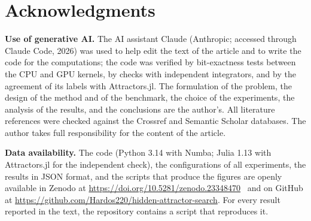 \section*{Acknowledgments}
\textbf{Use of generative AI.} The AI assistant Claude (Anthropic; accessed through Claude Code, 2026) was used to help edit the text of the article and to write the code for the computations; the code was verified by bit-exactness tests between the CPU and GPU kernels, by checks with independent integrators, and by the agreement of its labels with Attractors.jl. The formulation of the problem, the design of the method and of the benchmark, the choice of the experiments, the analysis of the results, and the conclusions are the author's. All literature references were checked against the Crossref and Semantic Scholar databases. The author takes full responsibility for the content of the article.

\textbf{Data availability.} The code (Python 3.14 with Numba; Julia 1.13 with Attractors.jl for the independent check), the configurations of all experiments, the results in JSON format, and the scripts that produce the figures are openly available in Zenodo at \url{https://doi.org/10.5281/zenodo.23348470}~\cite{Elisov2026Code} and on GitHub at \url{https://github.com/Hardos220/hidden-attractor-search}. For every result reported in the text, the repository contains a script that reproduces it.
